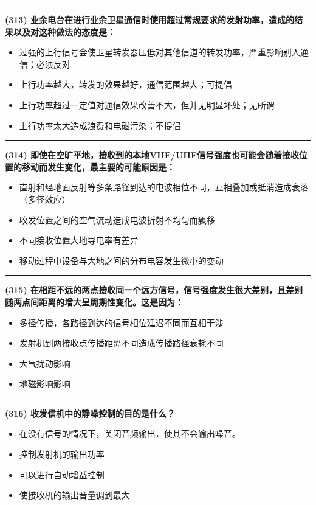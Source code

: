 \documentclass[twocolumn]{ctexart}  %
\begin{document}
\noindent\rule{0.5\textwidth}{1pt}
\heiti \textbf{(313) 业余电台在进行业余卫星通信时使用超过常规要求的发射功率，造成的结果以及对这种做法的态度是：} \songti {\color{gray} [LK0898] }
\begin{itemize}
	\item  过强的上行信号会使卫星转发器压低对其他信道的转发功率，严重影响别人通信；必须反对
	\item  上行功率越大，转发的效果越好，通信范围越大；可提倡
	\item  上行功率超过一定值对通信效果改善不大，但并无明显坏处；无所谓
	\item  上行功率太大造成浪费和电磁污染；不提倡
\end{itemize}


\noindent\rule{0.5\textwidth}{1pt}
\heiti \textbf{(314) 即使在空旷平地，接收到的本地VHF/UHF信号强度也可能会随着接收位置的移动而发生变化，最主要的可能原因是：} \songti {\color{gray} [LK0971] }
\begin{itemize}
	\item  直射和经地面反射等多条路径到达的电波相位不同，互相叠加或抵消造成衰落（多径效应）
	\item  收发位置之间的空气流动造成电波折射不均匀而飘移
	\item  不同接收位置大地导电率有差异
	\item  移动过程中设备与大地之间的分布电容发生微小的变动
\end{itemize}


\noindent\rule{0.5\textwidth}{1pt}
\heiti \textbf{(315) 在相距不远的两点接收同一个远方信号，信号强度发生很大差别，且差别随两点间距离的增大呈周期性变化。这是因为：} \songti {\color{gray} [LK1065] }
\begin{itemize}
	\item  多径传播，各路径到达的信号相位延迟不同而互相干涉
	\item  发射机到两接收点传播距离不同造成传播路径衰耗不同
	\item  大气扰动影响
	\item  地磁影响影响
\end{itemize}


\noindent\rule{0.5\textwidth}{1pt}
\heiti \textbf{(316) 收发信机中的静噪控制的目的是什么？} \songti {\color{gray} [LK1130] }
\begin{itemize}
	\item  在没有信号的情况下，关闭音频输出，使其不会输出噪音。
	\item  控制发射机的输出功率
	\item  可以进行自动增益控制
	\item  使接收机的输出音量调到最大
\end{itemize}
\end{document}

